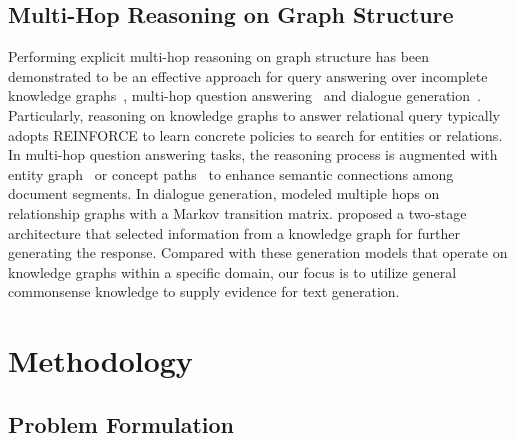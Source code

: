 \documentclass[11pt,a4paper]{article}
\begin{document}
\subsection{Multi-Hop Reasoning on Graph Structure}
Performing explicit multi-hop reasoning on graph structure has been demonstrated to be an effective approach for query answering over incomplete knowledge graphs~\citep{Das2018GoFA, Chen2018VariationalKG, Lin2018MultiHopKG}, multi-hop question answering~\citep{Bauer2018CommonsenseFG,Cao2018QuestionAB,Xiao2019DynamicallyFG} and dialogue generation~\citep{Tuan2019DyKgChatBD,Moon2019OpenDialKGEC, Liu2019KnowledgeAC}. Particularly, reasoning on knowledge graphs to answer relational query typically adopts REINFORCE to learn concrete policies to search for entities or relations. In multi-hop question answering tasks, the reasoning process is augmented with entity graph~\citep{Cao2018QuestionAB,Xiao2019DynamicallyFG} or concept paths~\citep{Bauer2018CommonsenseFG} to enhance semantic connections among document segments. 
In dialogue generation, \citet{Tuan2019DyKgChatBD} modeled multiple hops on relationship graphs with a Markov transition matrix. \citet{Liu2019KnowledgeAC} proposed a two-stage architecture that selected information from a knowledge graph for further generating the response. Compared with these generation models that operate on knowledge graphs within a specific domain, our focus is to utilize general commonsense knowledge to supply evidence for text generation.

\section{Methodology}



\subsection{Problem Formulation}
\end{document}
